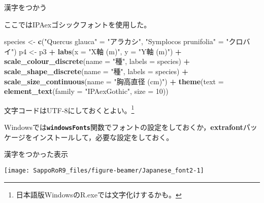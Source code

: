 \documentclass[ignorenonframetext,]{beamer}
\newenvironment{Shaded}{\begin{snugshade}}{\end{snugshade}}
\newcommand{\KeywordTok}[1]{\textcolor[rgb]{0.13,0.29,0.53}{\textbf{#1}}}
\newcommand{\DataTypeTok}[1]{\textcolor[rgb]{0.13,0.29,0.53}{#1}}
\newcommand{\DecValTok}[1]{\textcolor[rgb]{0.00,0.00,0.81}{#1}}
\newcommand{\StringTok}[1]{\textcolor[rgb]{0.31,0.60,0.02}{#1}}
\newcommand{\OperatorTok}[1]{\textcolor[rgb]{0.81,0.36,0.00}{\textbf{#1}}}
\newcommand{\NormalTok}[1]{#1}
\let\oldShaded\Shaded
\let\endoldShaded\endShaded
\renewenvironment{Shaded}{\footnotesize\oldShaded}{\endoldShaded}
\begin{document}
\begin{frame}[fragile]{漢字をつかう}

ここではIPAexゴシックフォントを使用した。

\begin{Shaded}
\begin{Highlighting}[]
\NormalTok{species <-}\StringTok{ }\KeywordTok{c}\NormalTok{(}\StringTok{"Quercus glauca"}\NormalTok{ =}\StringTok{ "アラカシ"}\NormalTok{,}
             \StringTok{"Symplocos prunifolia"}\NormalTok{ =}\StringTok{ "クロバイ"}\NormalTok{)}
\NormalTok{p4 <-}\StringTok{ }\NormalTok{p3 }\OperatorTok{+}\StringTok{ }\KeywordTok{labs}\NormalTok{(}\DataTypeTok{x =} \StringTok{"X軸 (m)"}\NormalTok{, }\DataTypeTok{y =} \StringTok{"Y軸 (m)"}\NormalTok{) }\OperatorTok{+}
\StringTok{  }\KeywordTok{scale_colour_discrete}\NormalTok{(}\DataTypeTok{name =} \StringTok{"種"}\NormalTok{, }\DataTypeTok{labels =}\NormalTok{ species) }\OperatorTok{+}
\StringTok{  }\KeywordTok{scale_shape_discrete}\NormalTok{(}\DataTypeTok{name =} \StringTok{"種"}\NormalTok{, }\DataTypeTok{labels =}\NormalTok{ species) }\OperatorTok{+}
\StringTok{  }\KeywordTok{scale_size_continuous}\NormalTok{(}\DataTypeTok{name =} \StringTok{"胸高直径 (cm)"}\NormalTok{) }\OperatorTok{+}
\StringTok{  }\KeywordTok{theme}\NormalTok{(}\DataTypeTok{text =} \KeywordTok{element_text}\NormalTok{(}\DataTypeTok{family =} \StringTok{"IPAexGothic"}\NormalTok{, }\DataTypeTok{size =} \DecValTok{10}\NormalTok{))}
\end{Highlighting}
\end{Shaded}

文字コードはUTF-8にしておくとよい。\footnote{日本語版WindowsのR.exeでは文字化けするかも。}

Windowsでは\textbf{\texttt{windowsFonts}}関数でフォントの設定をしておくか，\textbf{extrafont}パッケージをインストールして，必要な設定をしておく。

\end{frame}

\begin{frame}{漢字をつかった表示}

\texttt{[image: SappoRoR9\_files/figure-beamer/Japanese\_font2-1]}

\end{frame}
\end{document}

